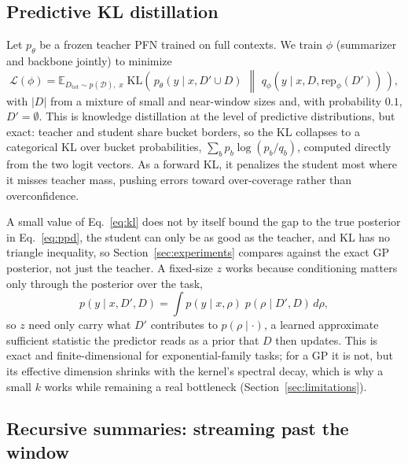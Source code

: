 \documentclass{article}
\newcommand{\Dtot}{D_{\mathrm{tot}}}
\newcommand{\Dfar}{D'}
\newcommand{\Dloc}{D}
\newcommand{\KL}[2]{\mathrm{KL}\!\left(#1 \,\middle\|\, #2\right)}
\newcommand{\rep}{\mathrm{rep}}
\begin{document}
\subsection{Predictive KL distillation}
\label{sec:kl}

Let $p_\theta$ be a frozen teacher PFN trained on full contexts. We train
$\phi$ (summarizer and backbone jointly) to minimize
\begin{equation}
\label{eq:kl}
  \mathcal{L}(\phi)
  = \mathbb{E}_{\Dtot \sim p(\mathcal{D}),\; x}\;
    \KL{\,p_\theta(y \mid x, \Dfar \cup \Dloc)\,}{\,q_\phi(y \mid x, \Dloc, \rep_\phi(\Dfar))\,},
\end{equation}
with $|\Dloc|$ from a mixture of small and near-window sizes and, with
probability $0.1$, $\Dfar = \emptyset$. This is knowledge distillation
\citep{hinton2015distillation, korattikara2015darkknowledge, malinin2020edd} at
the level of predictive distributions, but exact: teacher and student share
bucket borders, so the KL collapses to a categorical KL over bucket
probabilities, $\sum_b p_b \log(p_b/q_b)$, computed directly from the two logit
vectors. As a forward KL, it penalizes the student most where it misses teacher
mass, pushing errors toward over-coverage rather than overconfidence.

A small value of Eq.~\eqref{eq:kl} does not by itself bound the gap to the true
posterior in Eq.~\eqref{eq:ppd}, the student can only be as good as the
teacher, and KL has no triangle inequality, so
Section~\ref{sec:experiments} compares against the exact GP posterior, not just
the teacher. A fixed-size $z$ works because conditioning matters only through
the posterior over the task,
\begin{equation}
  p(y \mid x, \Dfar, \Dloc)
  = \int p(y \mid x, \rho)\; p(\rho \mid \Dfar, \Dloc)\, d\rho ,
\end{equation}
so $z$ need only carry what $\Dfar$ contributes to $p(\rho \mid \cdot)$, a
learned approximate sufficient statistic \citep{chen2021nass} the predictor
reads as a prior that $\Dloc$ then updates. This is exact and
finite-dimensional for exponential-family tasks; for a GP it is not, but its
effective dimension shrinks with the kernel's spectral decay, which is why a
small $k$ works while remaining a real bottleneck
(Section~\ref{sec:limitations}).

\subsection{Recursive summaries: streaming past the window}
\label{sec:recursive}
\end{document}
